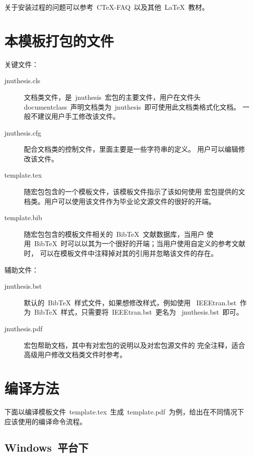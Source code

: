 \documentclass[pdftex, twoside, bachelor]{JNUthesis}
\begin{document}
\begin{spacing}{1.25}
关于安装过程的问题可以参考~C\TeX{}-FAQ~以及其他~\LaTeX{}~教材。

\section{本模板打包的文件}

关键文件：

\begin{description}
\item[jnuthesis.cls] 文档类文件，是~jnuthesis~宏包的主要文件，用户在文件头
  ~\\documentclass~声明文档类为~jnuthesis~即可使用此文档类格式化文档。
  一般不建议用户手工修改该文件。

\item[jnuthesis.cfg] 配合文档类的控制文件，里面主要是一些字符串的定义。
  用户可以编辑修改该文件。

\item[template.tex] 随宏包包含的一个模板文件，该模板文件指示了该如何使用
  宏包提供的文档类。用户可以使用该文件作为毕业论文源文件的很好的开端。

\item[template.bib] 随宏包包含的模板文件相关的~BibTeX~文献数据库，当用户
  使用~BibTeX~时可以以其为一个很好的开端；当用户使用自定义的参考文献时，
  可以在模板文件中注释掉对其的引用并忽略该文件的存在。
\end{description}

辅助文件：

\begin{description}
\item[jnuthesis.bst] 默认的~BibTeX~样式文件，如果想修改样式，例如使用
  ~IEEEtran.bst~作为~BibTeX~样式，只需要将~IEEEtran.bst~更名为
  ~jnuthesis.bst~即可。

\item[jnuthesis.pdf] 宏包帮助文档，其中有对宏包的说明以及对宏包源文件的
  完全注释，适合高级用户修改文档类文件时参考。
\end{description}

\section{编译方法}

下面以编译模板文件~template.tex~生成~template.pdf~为例，给出在不同情况下
应该使用的编译命令流程。

\subsection{Windows~平台下}


\end{spacing}
\end{document}
